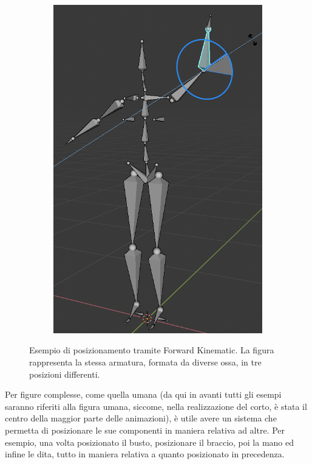 \begin{figure}
\begin{subfigure}{.33\textwidth}
  \includegraphics[width=\linewidth]{Figures/armature3}
  \label{fig:FK3}
\end{subfigure}
\decoRule
\caption[Cinematica Diretta]{Esempio di posizionamento tramite Forward Kinematic. La figura rappresenta la stessa armatura, formata da diverse ossa, in tre posizioni differenti.}
\label{fig:FK}
\end{figure}

Per figure complesse, come quella umana (da qui in avanti tutti gli esempi saranno riferiti alla figura umana, siccome, nella realizzazione del corto, è stata il centro della maggior parte delle animazioni), è utile avere un sistema che permetta di posizionare le sue componenti in maniera relativa ad altre.
Per esempio, una volta posizionato il busto, posizionare il braccio, poi la mano ed infine le dita, tutto in maniera relativa a quanto posizionato in precedenza.

